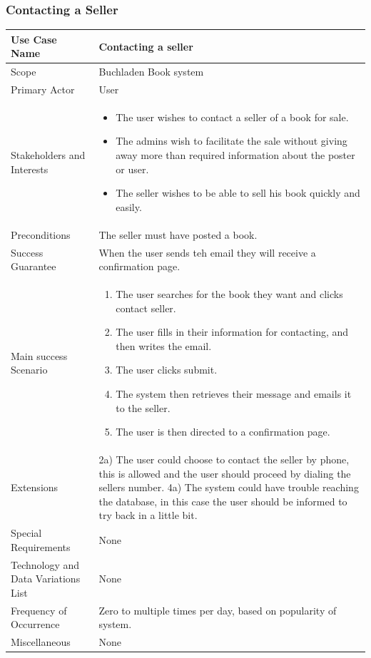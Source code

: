 \documentclass[11pt]{article}
\begin{document}
	\subsubsection{Contacting a Seller}
		\begin{longtable}{| l | p{8cm} |}
			\hline
			Use Case Name & Contacting a seller \\ \hline
			Scope & Buchladen Book system \\ \hline
			Primary Actor & User \\ \hline
			Stakeholders and Interests & \begin{itemize}
							\item The user wishes to contact a seller of a book for sale.
							\item The admins wish to facilitate the sale without giving away more than required information about the poster or user.
							\item The seller wishes to be able to sell his book quickly and easily.
						     \end{itemize} \\ \hline
			Preconditions & The seller must have posted a book. \\ \hline
			Success Guarantee & When the user sends teh email they will receive a confirmation page. \\ \hline
			Main success Scenario & \begin{enumerate}
							\item The user searches for the book they want and clicks contact seller.
							\item The user fills in their information for contacting, and then writes the email.
							\item The user clicks submit.
							\item The system then retrieves their message and emails it to the seller.
							\item The user is then directed to a confirmation page.
						\end{enumerate} \\ \hline
			Extensions & 2a) The user could choose to contact the seller by phone, this is allowed and the user should proceed by dialing the sellers number. \newline 
			4a) The system could have trouble reaching the database, in this case the user should be informed to try back in a little bit. \\ \hline
			Special Requirements & None \\ \hline
			Technology and Data Variations List & None \\ \hline
			Frequency of Occurrence & Zero to multiple times per day, based on popularity of system. \\ \hline
			Miscellaneous & None \\ \hline
		\end{longtable}
\end{document}
